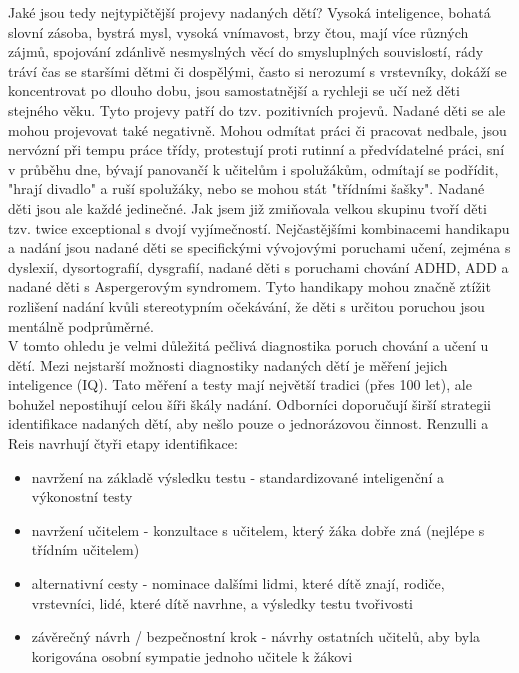 \documentclass[a4paper]{scrartcl}
\begin{document}
Jaké jsou tedy nejtypičtější projevy nadaných dětí? Vysoká inteligence, bohatá slovní zásoba, bystrá mysl, vysoká vnímavost, brzy čtou, mají více různých zájmů, spojování zdánlivě nesmyslných věcí do smysluplných souvislostí, rády tráví čas se staršími dětmi či dospělými, často si nerozumí s vrstevníky, dokáží se koncentrovat po dlouho dobu, jsou samostatnější a rychleji se učí než děti stejného věku.\cite{nadani_wikipedie,tak_mali} Tyto projevy patří do tzv. pozitivních projevů. Nadané děti se ale mohou projevovat také negativně. Mohou odmítat práci či pracovat nedbale, jsou nervózní při tempu práce třídy, protestují proti rutinní a předvídatelné práci, sní v průběhu dne, bývají panovančí k učitelům i spolužákům, odmítají se podřídit, "hrají divadlo" a ruší spolužáky, nebo se mohou stát "třídními šašky".\cite{def_nadane_deti} Nadané děti jsou ale každé jedinečné. Jak jsem již zmiňovala velkou skupinu tvoří děti tzv. twice exceptional s dvojí vyjímečností. Nejčastějšími kombinacemi handikapu a nadání jsou nadané děti se specifickými vývojovými poruchami učení, zejména s dyslexií, dysortografií, dysgrafií, nadané děti s poruchami chování ADHD, ADD a nadané děti s Aspergerovým syndromem. Tyto handikapy mohou značně ztížit rozlišení nadání kvůli stereotypním očekávání, že děti s určitou poruchou jsou mentálně podprůměrné.\cite{dvoji_vyjimecnost}\\

V tomto ohledu je velmi důležitá pečlivá diagnostika poruch chování a učení u dětí. Mezi nejstarší možnosti diagnostiky nadaných dětí je měření jejich inteligence (IQ). Tato měření a testy mají největší tradici (přes 100 let), ale bohužel nepostihují celou šíři škály nadání. Odborníci doporučují širší strategii identifikace nadaných dětí, aby nešlo pouze o jednorázovou činnost. Renzulli a Reis navrhují čtyři etapy identifikace:
    
    \begin{itemize}
        \item navržení na základě výsledku testu - standardizované inteligenční a výkonostní testy
        \item navržení učitelem - konzultace s učitelem, který žáka dobře zná (nejlépe s třídním učitelem)
        \item alternativní cesty - nominace dalšími lidmi, které dítě znají, rodiče, vrstevníci, lidé, které dítě navrhne, a výsledky testu tvořivosti
        \item závěrečný návrh / bezpečnostní krok - návrhy ostatních učitelů, aby byla korigována osobní sympatie jednoho učitele k žákovi \cite{def_nadane_deti}
    \end{itemize}
    
\end{document}
